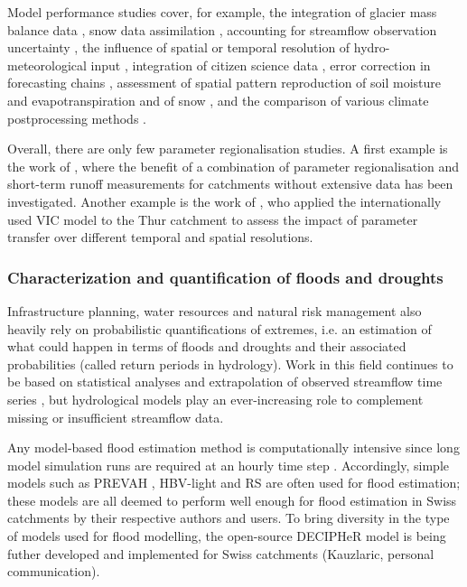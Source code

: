 \documentclass[10pt,a4paper]{article}
\begin{document}
Model performance studies cover, for example, the integration of glacier mass balance data \citep{Finger2015, schaeflihuss11}, snow data assimilation \citep{Griessinger2016}, accounting for streamflow observation uncertainty \citep{Westerberg2020}, the influence of spatial or temporal resolution of hydro-meteorological input \citep{GironsLopez2016, Felder2017, Sikorska2018}, integration of citizen science data \citep{Etter2020}, error correction in forecasting chains \citep{Bogner2018}, assessment of spatial pattern reproduction of soil moisture and evapotranspiration \citep{Rossler2010, Zappa2003} and of snow \citep{Zappa2008a}, and the comparison of various climate postprocessing methods \citep{Rossler2019}.

Overall, there are only few parameter regionalisation studies. A first example is the work of \citet{Viviroli2015}, where the benefit of a combination of parameter regionalisation and short-term runoff measurements for catchments without extensive data has been investigated. Another example is the work of \citet{Melsen2016}, who applied the internationally used VIC model to the Thur catchment to assess the impact of parameter transfer over different temporal and spatial resolutions.


\subsubsection{Characterization and quantification of floods and droughts}
\label{sec:application:floodsdroughts}

Infrastructure planning, water resources and natural risk management also heavily rely on probabilistic quantifications of extremes, i.e. an estimation of what could happen in terms of floods and droughts and their associated probabilities (called return periods in hydrology). Work in this field continues to be based on statistical analyses and extrapolation of observed streamflow time series \citep{Brunner2018, Asadi20108}, but hydrological models play an ever-increasing role to complement missing or insufficient streamflow data.

Any model-based flood estimation method is computationally intensive since long model simulation runs are required at an hourly time step \citep[see][about reducing computational requirements for extreme flood estimation by hydrological modelling]{Sikorska-Senoner2020}. Accordingly, simple models such as PREVAH \citep{Viviroli2009, Viviroli2009c, Felder2017}, HBV-light \citep{Sikorska2017, Brunner2019a, Sikorska-Senoner2020} and  RS \citep{Bieri2013, Zeimetz2017, Zeimetz2018} are often used for flood estimation; these models are all deemed to perform well enough for flood estimation in Swiss catchments by their respective authors and users. To bring diversity in the type of models used for flood modelling, the open-source DECIPHeR model is being futher developed and implemented for Swiss catchments (Kauzlaric, personal communication).
\end{document}
